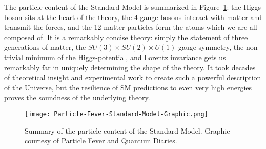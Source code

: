 The particle content of the Standard Model is summarized in Figure~\ref{fig:sm:summary_fever}: the Higgs boson sits at the heart of the theory, the 4 gauge bosons interact with matter and transmit the forces, and the 12 matter particles form the atoms which we are all composed of. It is a remarkably concise theory: simply the statement of three generations of matter, the $SU(3)\times SU(2)\times U(1)$ gauge symmetry, the non-trivial minimum of the Higgs-potential, and Lorentz invariance gets us remarkably far in uniquely determining the shape of the theory. It took decades of theoretical insight and experimental work to create such a powerful description of the Universe, but the resilience of SM predictions to even very high energies proves the soundness of the underlying theory. 


\begin{figure}
\centering
\texttt{[image: Particle-Fever-Standard-Model-Graphic.png]}
\caption{Summary of the particle content of the Standard Model. Graphic courtesy of Particle Fever and Quantum Diaries.}
\label{fig:sm:summary_fever}
\end{figure}

